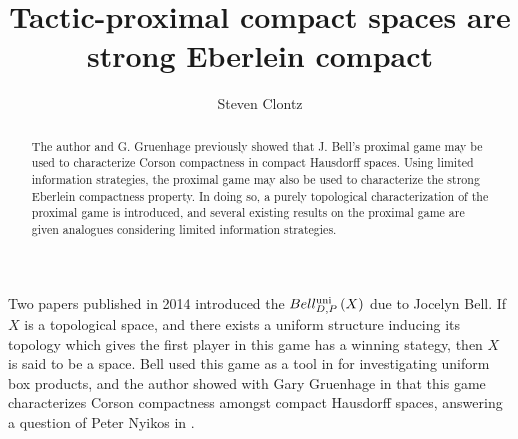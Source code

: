 \documentclass{amsart}
\theoremstyle{definition}
\begin{document}
\title{Tactic-proximal compact spaces are strong Eberlein compact}




\author{Steven Clontz}
\address{Department of Mathematics and Statistics, UNC Charlotte,
Charlotte, NC 28262}




\begin{abstract}
  The author and G. Gruenhage previously showed that J. Bell's proximal game
  may be used to characterize Corson compactness in compact Hausdorff spaces.
  Using limited information strategies, the proximal game may also be
  used to characterize the strong Eberlein compactness property.
  In doing so, a purely topological characterization of the proximal game
  is introduced, and several existing results on
  the proximal game are given
  analogues considering limited information strategies.
\end{abstract}


\maketitle

  Two papers published in 2014 introduced the
  \(Bell_{D,P}^{\textrm{uni}}\left({X}\right)\) due to Jocelyn Bell. If \(X\) is a
  topological space, and there exists a uniform structure inducing its topology
  which gives the first player in this game has a winning stategy,
  then \(X\) is said to be a  space. Bell used this
  game as a tool in \cite{MR3239205} for investigating uniform box products,
  and the author showed with Gary Gruenhage in \cite{MR3227201} that
  this game characterizes Corson compactness amongst compact Hausdorff spaces,
  answering a question of Peter Nyikos in \cite{nyikosProximalPreprint}.
\end{document}
